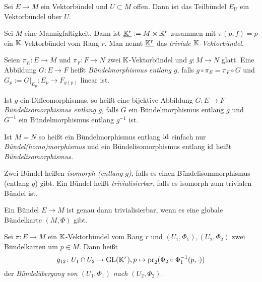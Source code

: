 \begin{proposition}
  Sei $E\to M$ ein Vektorbündel und $U\subset M$ offen. Dann ist das
  Teilbündel $E_U$ ein Vektorbündel über $U$.
\end{proposition}

\begin{proposition}
  Sei $M$ eine Mannigfaltigkeit. Dann ist $\underline{\mathbb{K}^r} := M\times \mathbb{K}^r$ zusammen mit
  $\pi(p,f) = p$ ein $\mathbb{K}$-Vektorbündel vom Rang $r$. Man nennt
  $\underline{\mathbb{K}^r}$ das \emph{triviale $\mathbb{K}$-Vektorbündel}.
\end{proposition}

\begin{definition}
  Seien $\pi_E\colon E\to M$ und $\pi_F\colon F \to N$ zwei
  $\mathbb{K}$-Vektorbündel und $g\colon M\to N$ glatt. Eine Abbildung
  $G\colon E\to F$ heißt \emph{Bündelmorphismus entlang $g$}, falls
  $g\circ\pi_E = \pi_F\circ G$ und $G_p := G|_{E_p} \colon E_p \to
  F_{g(p)}$ linear ist.

  Ist $g$ ein Diffeomorphismus, so heißt eine bijektive Abbildung $G
  \colon E\to F$ \emph{Bündelisomorphismus
    entlang $g$}, falls $G$ ein Bündelmorphismus entlang $g$ und
  $G^{-1}$ ein Bündelmorphismus entlang $g^{-1}$ ist.

  Ist $M=N$ so heißt ein Bündelmorphismus entlang $\operatorname{id}$ einfach nur
  \emph{Bündel(homo)morphismus} und ein Bündelisomorphismus entlang
  $\operatorname{id}$ heißt \emph{Bündelisomorphismus}.

  Zwei Bündel heißen \emph{isomorph (entlang $g$)}, falls es einen
  Bündelisommorphismus (entlang $g$) gibt. Ein Bündel heißt
  \emph{trivialisierbar}, falls es isomorph zum trivialen Bündel ist.
\end{definition}

\begin{proposition}
  Ein Bündel $E\to M$ ist genau dann trivialisierbar, wenn es eine
  globale Bündelkarte $(M,\Phi)$ gibt.
\end{proposition}

\begin{definition}
  Sei $\pi\colon E\to M$ ein $\mathbb{K}$-Vektorbündel vom Rang $r$ und $(U_1,\Phi_1),
  (U_2,\Phi_2)$ zwei Bündelkarten um $p\in M$. Dann heißt
  \begin{equation*}
    g_{12} \colon U_1\cap U_2 \to \operatorname{GL}(\mathbb{K}^r), p\mapsto \operatorname{pr}_2(\Phi_2\circ \Phi_1^{-1}(p,\cdot))
  \end{equation*}
  der \emph{Bündelübergang von $(U_1,\Phi_1)$ nach $(U_2,\Phi_2)$}.
\end{definition}


